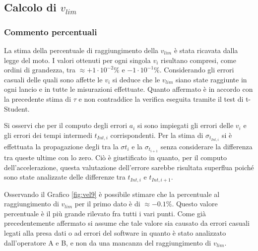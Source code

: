 \documentclass[a4paper,11pt,oneside]{article}
\begin{document}
\subsection{Calcolo di $v_{lim}$}
\subsubsection*{Commento percentuali}
La stima della percentuale di raggiungimento della $v_{lim}$ è stata ricavata dalla legge del moto. I valori ottenuti per ogni singola $v_{i}$ risultano compresi, come ordini di grandezza, tra $\approx \si{+ 1 \cdot 10^{-2}}\%$ e $ \si{- 1 \cdot 10^{-1}}\%$. Considerando gli errori casuali delle quali sono affette le $v_{i}$ si deduce che le $v_{lim}$ siano state raggiunte in ogni lancio e in tutte le misurazioni effettuate. Quanto affermato è in accordo con la precedente stima di $\tau$ e non contraddice la verifica eseguita tramite il test di t-Student.\newline

Si osservi che per il computo degli errori $a_{i}$ si sono impiegati gli errori delle $v_{i}$ e gli errori dei tempi intermedi $t_{Int, i}$ corrispondenti. Per la stima di $\sigma_{t_{Int, i}}$ si è effettuata la propagazione degli tra la  $\sigma{t_{i}}$ e la $\sigma_{t_{i+1}}$ senza considerare la differenza tra queste ultime con lo zero. Ciò è giustificato in quanto, per il computo dell'accelerazione, questa valutazione dell'errore sarebbe risultata superflua poiché sono state analizzate delle differenze tra $t_{Int, i}$ e $t_{Int, i+1}$. \newline



Osservando il Grafico \ref{fig:vel9} è possibile stimare che la percentuale al raggiungimento di $v_{lim}$ per il primo dato è di $\approx -0.1\%$. Questo valore percentuale è il più grande rilevato fra tutti i vari punti. Come già precedentemente affermato si assume che tale valore sia causato da errori casuali legati alla presa dati o ad errori del software in quanto è stato analizzato dall'operatore A e B, e non da una mancanza del raggiungimento di $v_{lim}$.\newline
\end{document}
